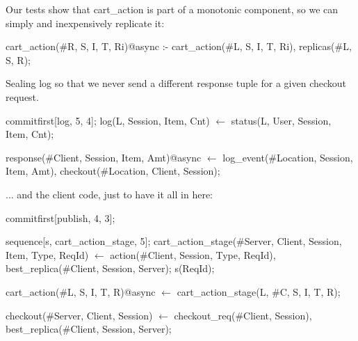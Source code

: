 Our tests show that cart\_action is part of a monotonic component, so we can simply and inexpensively replicate it:

\begin{Dedalus}
cart_action(#R, S, I, T, Ri)@async :-
    cart_action(#L, S, I, T, Ri),
    replicas(#L, S, R);
\end{Dedalus}


Sealing log so that we never send a different response tuple for a given checkout request. 

\begin{Dedalus}

commitfirst[log, 5, 4];
log(L, Session, Item, Cnt) \(\leftarrow\) 
    status(L, User, Session, Item, Cnt);

response(#Client, Session, Item, Amt)@async \(\leftarrow\)
    log_event(#Location, Session, Item, Amt),
    checkout(#Location, Client, Session);
\end{Dedalus}


... and the client code, just to have it all in here:

\begin{Dedalus}
commitfirst[publish, 4, 3];

sequence[s, cart_action_stage, 5];
cart_action_stage(#Server, Client, Session, Item, Type, ReqId) \(\leftarrow\)
    action(#Client, Session, Type, ReqId),
    best_replica(#Client, Session, Server);
    s(ReqId);

cart_action(#L, S, I, T, R)@async \(\leftarrow\) 
    cart_action_stage(L, #C, S, I, T, R);

checkout(#Server, Client, Session) \(\leftarrow\)
    checkout_req(#Client, Session),
    best_replica(#Client, Session, Server);
\end{Dedalus}


